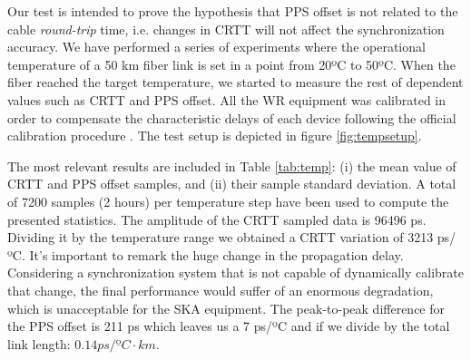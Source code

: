 Our test is intended to prove the hypothesis that PPS offset is not related to 
the cable \textit{round-trip} time, i.e. changes in CRTT will not affect the 
synchronization accuracy. We have performed a series of experiments where the 
operational temperature of a 50 km fiber link is set in a point from 20ºC to 
50ºC. When the fiber reached the target temperature, we started to measure the 
rest of dependent values such as CRTT and PPS offset. All the WR equipment was 
calibrated in order to compensate the characteristic delays of each device 
following the official calibration procedure \cite{man:calib}.  The test setup 
is depicted in figure \ref{fig:tempsetup}.

The most relevant results are included in Table \ref{tab:temp}: (i) the mean 
value of CRTT and PPS offset samples, and (ii) their sample standard deviation. 
A total of 7200 samples (2 hours) per temperature step have been used to 
compute the presented statistics. The amplitude of the CRTT sampled data is 
96496 ps. Dividing it by the temperature range we obtained a CRTT variation of 
3213 ps/ºC. It's important to remark the huge change in the propagation delay. 
Considering a synchronization system that is not capable of dynamically 
calibrate that change, the final performance would suffer of an enormous 
degradation, which is unacceptable for the SKA equipment. The peak-to-peak 
difference for the PPS offset is 211 ps which leaves us a 7 ps/ºC and if we 
divide by the total link length: $0.14 ps/ºC \cdot km$.

